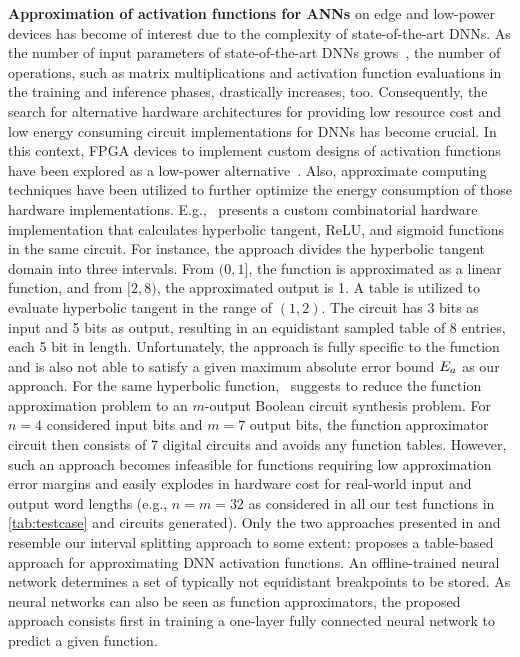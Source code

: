 {\textbf{Approximation of activation functions for \acp{ANN}} on edge and low-power devices has become of interest due to the complexity of state-of-the-art \acp{DNN}. 
As the number of input parameters of state-of-the-art \acp{DNN} grows~\cite{Transformers:2022,GPT3}, the number of operations, such as matrix multiplications and activation function evaluations in the training and inference phases, drastically increases, too. 
Consequently, the search for alternative hardware architectures for providing low resource cost and low energy consuming circuit implementations for \acp{DNN} has become crucial. 
In this context, \ac{FPGA} devices to implement custom designs of activation functions have been explored as a low-power alternative~\cite{Dong:2021,Chang:2019,Yu:2022,Tao:2019}. 
Also, approximate computing techniques have been utilized to further optimize the energy consumption of those hardware implementations.
E.g.,~\cite{Chang:2019} presents a custom combinatorial hardware implementation that calculates hyperbolic tangent, ReLU, and sigmoid functions in the same circuit.
For instance, the approach divides the hyperbolic tangent domain into three intervals. 
From $(0,1]$, the function is approximated as a linear function, and from $[2,8)$, the approximated output is 1. 
A table is utilized to evaluate hyperbolic tangent in the range of $(1,2)$. 
The circuit has 3 bits as input and 5 bits as output, resulting in an equidistant sampled table of 8 entries, each 5 bit in length. 
Unfortunately, the approach is fully specific to the function and is also not able to satisfy a given maximum absolute error bound $E_a$ as our approach.
For the same hyperbolic function,~\cite{Tao:2019} suggests to reduce the function approximation problem to an $m$-output Boolean circuit synthesis problem. 
For $n=4$ considered input bits and $m=7$ output bits, the function approximator circuit then consists of 7 digital circuits and avoids any function tables. 
However, such an approach becomes infeasible for functions requiring low approximation error margins and easily explodes in hardware cost for real-world input and output word lengths (e.g., $n=m=32$ as considered in all our test functions in \cref{tab:testcase} and circuits generated).
Only the two approaches presented in \cite{Yu:2022} and~\cite{Raha} resemble our interval splitting approach to some extent:
\cite{Yu:2022} proposes a table-based approach for approximating \ac{DNN} activation functions. 
An offline-trained neural network determines a set of typically not equidistant breakpoints to be stored.
As neural networks can also be seen as function approximators, the proposed approach consists first in training a one-layer fully connected neural network to predict a given function.
}
